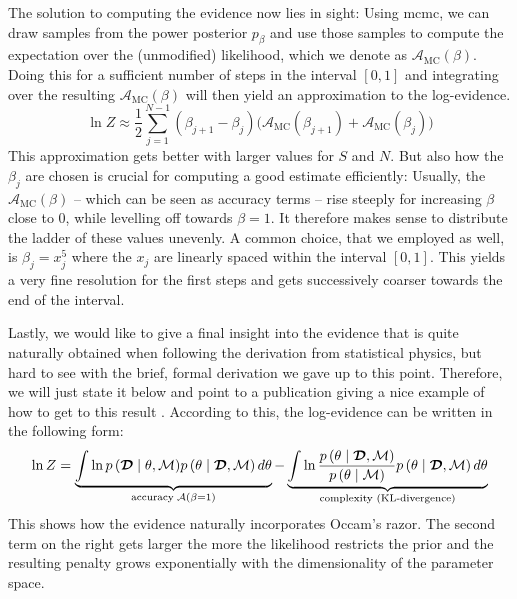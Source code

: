 \documentclass[\relativeRoot/main.tex]{subfiles}
\begin{document}
%
The solution to computing the evidence now lies in sight: Using \gls{mcmc}, we can draw samples from the power posterior $p_\beta$ and use those samples to compute the expectation over the (unmodified) likelihood, which we denote as $\mathcal{A}_\text{MC}(\beta)$. Doing this for a sufficient number of steps in the interval $\left[ 0, 1 \right]$ and integrating over the resulting $\mathcal{A}_\text{MC}(\beta)$ will then yield an approximation to the log-evidence.
%
\begin{equation}
    \ln{Z} \approx \frac{1}{2} \sum_{j=1}^{N-1} \left( \beta_{j+1} - \beta_j \right) \big( \mathcal{A}_\text{MC}(\beta_{j+1}) + \mathcal{A}_\text{MC}(\beta_j) \big)
\end{equation}
%
This approximation gets better with larger values for $S$ and $N$. But also how the $\beta_j$ are chosen is crucial for computing a good estimate efficiently: Usually, the $\mathcal{A}_\text{MC}(\beta)$ -- which can be seen as accuracy terms -- rise steeply for increasing $\beta$ close to 0, while levelling off towards $\beta=1$. It therefore makes sense to distribute the ladder of these values unevenly. A common choice, that we employed as well, is $\beta_j = x_j^5$ where the $x_j$ are linearly spaced within the interval $[0, 1]$. This yields a very fine resolution for the first steps and gets successively coarser towards the end of the interval.

Lastly, we would like to give a final insight into the evidence that is quite naturally obtained when following the derivation from statistical physics, but hard to see with the brief, formal derivation we gave up to this point. Therefore, we will just state it below and point to a publication giving a nice example of how to get to this result \cite{aponte_introduction_2022}. According to this, the log-evidence can be written in the following form:
%
\begin{equation} \label{eq:ti:acc_vs_kl}
    \ln{Z} = \underbrace{\int{ \ln{ p \left( \boldsymbol{\mathcal{D}} \mid \theta, \mathcal{M} \right) } p \left( \theta \mid \boldsymbol{\mathcal{D}}, \mathcal{M} \right) d\theta}}_{\text{accuracy} \; \mathcal{A}(\beta = 1)} - \underbrace{\int{ \ln{ \frac{p \left( \theta \mid \boldsymbol{\mathcal{D}}, \mathcal{M} \right)}{p \left( \theta \mid \mathcal{M} \right)} } p \left( \theta \mid \boldsymbol{\mathcal{D}}, \mathcal{M} \right) d\theta}}_\text{complexity (KL-divergence)}
\end{equation}
%
This shows how the evidence naturally incorporates Occam's razor. The second term on the right gets larger the more the likelihood restricts the prior and the resulting penalty grows exponentially with the dimensionality of the parameter space.
\end{document}

